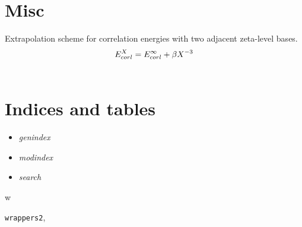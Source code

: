 \documentclass[letterpaper,10pt,english]{sphinxmanual}
\begin{document}
\chapter{Misc}
\label{index:misc}

\begin{fulllineitems}
\label{index:wrappers2.corl_xtpl_helgaker_2}
Extrapolation scheme for correlation energies with two adjacent zeta-level bases.
\begin{gather}
\begin{split}E_{corl}^X = E_{corl}^{\infty} + \beta X^{-3}\end{split}\notag\\\begin{split}\end{split}\notag
\end{gather}
\end{fulllineitems}



\chapter{Indices and tables}
\label{index:indices-and-tables}\begin{itemize}
\item {} 
\emph{genindex}

\item {} 
\emph{modindex}

\item {} 
\emph{search}

\end{itemize}


\renewcommand{\indexname}{Python Module Index}
\begin{theindex}
\def\bigletter#1{{\Large\sffamily#1}\nopagebreak\vspace{1mm}}
\bigletter{w}
\item {\texttt{wrappers2}}, \pageref{index:module-wrappers2}
\end{theindex}

\renewcommand{\indexname}{Index}
\printindex
\end{document}
